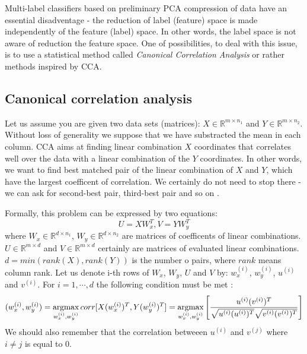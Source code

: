 Multi-label classifiers based on preliminary PCA compression of data have an essential disadventage - the reduction of label (feature) space is made independently of the feature (label) space. In other words, the label space is not aware of reduction the feature space. One of possibilities, to deal with this issue, is to use a statistical method called \textit{Canonical Correlation Analysis} or rather methods inspired by CCA.   

\subsection{Canonical correlation analysis}

Let us assume you are given two data sets (matrices): $X \in \mathbb{R}^{m \times n_1}$ and $Y \in \mathbb{R}^{m \times n_2}$. Without loss of generality we suppose that we have substracted the mean in each column. CCA aims at finding linear combination $X$ coordinates that correlates well over the data with a linear combination of the $Y$ coordinates. In other words, we want to find best matched pair of the linear combination of $X$ and $Y$, which have the largest coefficent of correlation. We certainly do not need to stop there - we can ask for second-best pair, third-best pair and so on \cite{William}.

Formally, this problem can be expressed by two equations:
\begin{equation}\label{eq:cca1}
    U=XW_x^T,   V=YW_y^T    
\end{equation}
where $W_x \in \mathbb{R}^{d \times n_1}$, $W_y \in \mathbb{R}^{d \times n_2}$ are matrices of coefficents of linear combinations. $U \in \mathbb{R}^{m \times d}$ and $V \in \mathbb{R}^{m \times d}$ certainly are matrices of evaluated linear combinations. $d=min(rank(X), rank(Y))$ is the number o pairs, where $rank$ means column rank. Let us denote i-th rows of $W_x$, $W_y$, $U$ and $V$ by: $w_x^{(i)}$, $w_y^{(i)}$, $u^{(i)}$ and $v^{(i)}$. For $i=1,\cdots,d$ the following condition must be met \cite{William}:
\begin{equation}\label{eq:cca2}
    (w_x^{(i)}, w_y^{(i)})=\operatorname*{argmax}_{w_x^{(i)}, w_y^{(i)}} corr[X(w_x^{(i)})^T, Y(w_y^{(i)})^T] = \operatorname*{argmax}_{w_x^{(i)}, w_y^{(i)}} \left[\frac{u^{(i)}(v^{(i)})^T}{\sqrt{u^{(i)}(u^{(i)})^T}\sqrt{v^{(i)}(v^{(i)})^T}}\right] 
\end{equation}
We should also remember that the correlation betweeen $u^{(i)}$ and $v^{(j)}$ where $i\neq j$ is equal to $0$.

